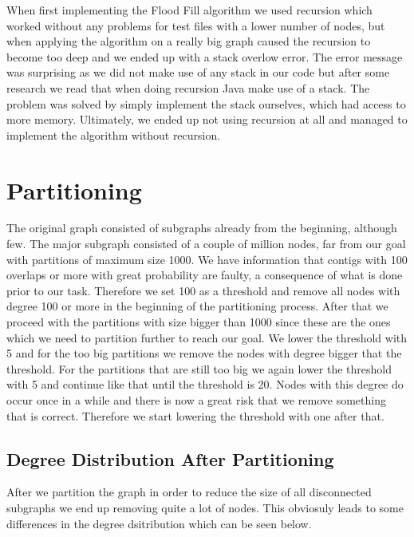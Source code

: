 \documentclass[a4paper,10pt]{article}
\begin{document}
When first implementing the Flood Fill algorithm we used recursion which worked without any problems for test files with a lower number of nodes, but when 
applying the algorithm on a really big graph caused the recursion to become too deep and we ended up with a stack overlow error. 
The error message was surprising as we did not make use of any stack in our code but after some research we read that when doing recursion Java make use of a stack. 
The problem was solved by simply implement the stack ourselves, which had access to more memory. Ultimately, we ended up not using recursion at all and managed 
to implement the algorithm without recursion. 


\section{Partitioning}

The original graph consisted of subgraphs already from the beginning, although few. The major subgraph consisted of a couple of million
nodes, far from our goal with partitions of maximum size 1000. We have information that contigs with 100 overlaps or more with great
probability are faulty, a consequence of what is done prior to our task. Therefore we set 100 as a threshold and remove all nodes with
degree 100 or more in the beginning of the partitioning process. After that we proceed with the partitions with size bigger than 1000
since these are the ones which we need to partition further to reach our goal. We lower the threshold with 5 and for the too big
partitions we remove the nodes with degree bigger that the threshold. For the partitions that are still too big we again lower the
threshold with 5 and continue like that until the threshold is 20. Nodes with this degree do occur once in a while and there is now a
great risk that we remove something that is correct. Therefore we start lowering the threshold with one after that.



\subsection{Degree Distribution After Partitioning}

After we partition the graph in order to reduce the size of all disconnected subgraphs we end up removing quite a lot of nodes. This obviosuly leads to some differences in the degree dsitribution which can be seen below.
\end{document}
